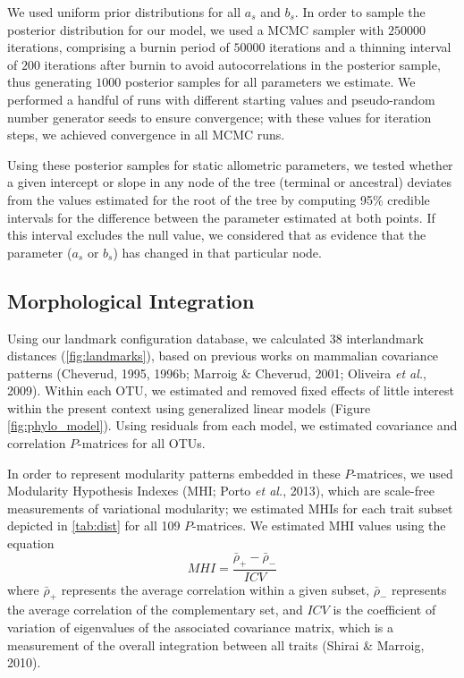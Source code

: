 \documentclass[12pt,twoside]{report}
\begin{document}
We used uniform prior distributions for all $a_s$ and $b_s$. In order to
sample the posterior distribution for our model, we used a MCMC sampler
with $250000$ iterations, comprising a burnin period of $50000$
iterations and a thinning interval of $200$ iterations after burnin to
avoid autocorrelations in the posterior sample, thus generating $1000$
posterior samples for all parameters we estimate. We performed a handful
of runs with different starting values and pseudo-random number
generator seeds to ensure convergence; with these values for iteration
steps, we achieved convergence in all MCMC runs.

Using these posterior samples for static allometric parameters, we
tested whether a given intercept or slope in any node of the tree
(terminal or ancestral) deviates from the values estimated for the root
of the tree by computing 95\% credible intervals for the difference
between the parameter estimated at both points. If this interval
excludes the null value, we considered that as evidence that the
parameter ($a_s$ or $b_s$) has changed in that particular node.

\subsection{Morphological Integration}\label{morphological-integration}

Using our landmark configuration database, we calculated 38
interlandmark distances (\autoref{fig:landmarks}), based on previous
works on mammalian covariance patterns (Cheverud, 1995, 1996b; Marroig
\& Cheverud, 2001; Oliveira \emph{et al.}, 2009). Within each OTU, we
estimated and removed fixed effects of little interest within the
present context using generalized linear models (Figure
\ref{fig:phylo_model}). Using residuals from each model, we estimated
covariance and correlation $P$-matrices for all OTUs.

In order to represent modularity patterns embedded in these
$P$-matrices, we used Modularity Hypothesis Indexes (MHI; Porto \emph{et
al.}, 2013), which are scale-free measurements of variational
modularity; we estimated MHIs for each trait subset depicted in
\autoref{tab:dist} for all 109 $P$-matrices. We estimated MHI values
using the equation \[
MHI = \frac {\bar{\rho}_{+} - \bar{\rho}_{-}} {ICV}
\] where $\bar{\rho}_{+}$ represents the average correlation within a
given subset, $\bar{\rho}_{-}$ represents the average correlation of the
complementary set, and $ICV$ is the coefficient of variation of
eigenvalues of the associated covariance matrix, which is a measurement
of the overall integration between all traits (Shirai \& Marroig, 2010).
\end{document}
